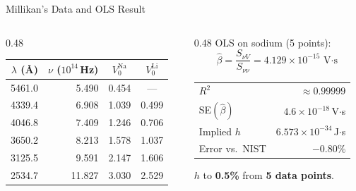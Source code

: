 \documentclass[aspectratio=169]{beamer}
\begin{document}
\begin{frame}{Millikan's Data and OLS Result}

\begin{columns}[T]
\begin{column}{0.48\textwidth}
\begin{center}
\begin{tabular}{rrcc}
\toprule
$\lambda$ (\AA) & $\nu$ ($10^{14}$\,Hz)
  & $V_0^{\mathrm{Na}}$ & $V_0^{\mathrm{Li}}$ \\
\midrule
5461.0 &  5.490 & 0.454 & ---   \\
4339.4 &  6.908 & 1.039 & 0.499 \\
4046.8 &  7.409 & 1.246 & 0.706 \\
3650.2 &  8.213 & 1.578 & 1.037 \\
3125.5 &  9.591 & 2.147 & 1.606 \\
2534.7 & 11.827 & 3.030 & 2.529 \\
\bottomrule
\end{tabular}
\end{center}
\end{column}
\begin{column}{0.48\textwidth}
OLS on sodium (5 points):
\[
  \hat\beta = \frac{S_{\nu V}}{S_{\nu\nu}}
            = 4.129\times10^{-15}\,\text{V$\cdot$s}
\]

\begin{center}
\begin{tabular}{lr}
\toprule
$R^2$ & $\approx 0.99999$ \\
SE$(\hat\beta)$ & $4.6\times10^{-18}$\,V$\cdot$s \\
Implied $h$ & $6.573\times10^{-34}$\,J$\cdot$s \\
Error vs.\ NIST & $-0.80\%$ \\
\bottomrule
\end{tabular}
\end{center}

\medskip
$h$ to \textbf{0.5\%} from \textbf{5 data points}.
\end{column}
\end{columns}

\end{frame}
\end{document}
